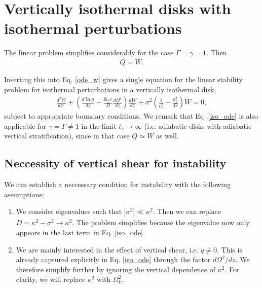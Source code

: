 \section{Vertically isothermal disks with 
  isothermal perturbations}
The linear problem simplifies considerably for the case
$\Gamma=\gamma=1$. Then 
\begin{align}
  Q=W. 
\end{align}

Inserting this into Eq. \ref{ode_w} gives a single equation for the linear stability
problem for isothermal perturbations in a vertically isothermal disk, 
\begin{align}\label{iso_ode}
  \frac{d^2W}{dz^2} + \left(\frac{d\ln{\rho}}{dz} - \frac{\ii k_x
      r}{D}\frac{d\Omega^2}{dz}\right) \frac{dW}{dz} +
  \sigma^2\left(\frac{1}{c_s^2} + \frac{k_x^2}{D}\right)W=0, 
\end{align} 
subject to appropriate boundary conditions. We remark that Eq
.\ref{iso_ode} is also applicable for    
$\gamma=\Gamma\neq 1$ in the limit $t_c\to\infty$ (i.e. adiabatic
disks with adiabatic vertical stratification), since in that case  
$Q\simeq W$ as well. 


\subsection{Neccessity of vertical shear for instability}\label{integral_relation}
We can establish a neccessary condition for instability with the
following assumptions:

\begin{enumerate}
\item We consider eigenvalues such that
  $|\sigma^2|\ll \kappa^2$. Then we can replace $D=\kappa^2 -\sigma^2\to
  \kappa^2$. The problem simplifies because the eigenvalue now only
  appears in the last term in Eq. \ref{iso_ode}. 
\item We are mainly interested in the effect of vertical shear, i.e. $q\neq
0$. This is already captured explicitly in Eq. \ref{iso_ode} through
the factor $d\Omega^2/dz$. We 
therefore simplify further by ignoring the vertical dependence of
$\kappa^2$. For clarity, we will replace  $\kappa^2$ with $\Omega_k^2$.  
\end{enumerate}

